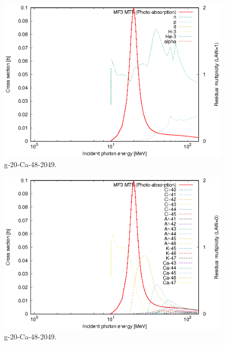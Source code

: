 \begin{figure}
 \includegraphics[width=\linewidth]{eps/g_20-Ca-48_2049.eps}
  \caption{g-20-Ca-48-2049.}
\end{figure}
\begin{figure}
 \includegraphics[width=\linewidth]{eps-law0/g_20-Ca-48_2049.eps}
 \caption{g-20-Ca-48-2049.}
\end{figure}
\newpage \clearpage

